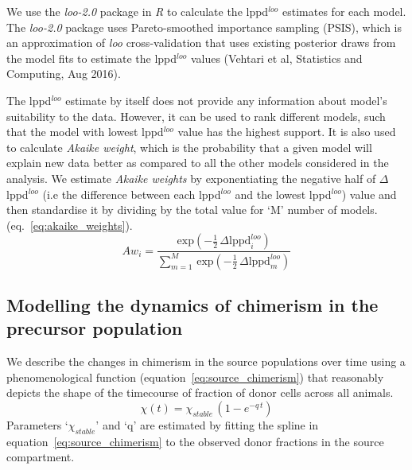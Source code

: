 \documentclass[11pt]{article}
\newcommand{\be}{\begin{equation}}
\newcommand{\ee}{\end{equation}}
\begin{document}
We use the \textit{loo-2.0} package in \textit{R} to calculate the lppd$^{loo}$ estimates for each model. 
The \textit{loo-2.0} package uses Pareto-smoothed importance sampling (PSIS), which is an approximation of \textit{loo} cross-validation that uses existing posterior draws from the model fits to estimate the lppd$^{loo}$ values (Vehtari et al, Statistics and Computing, Aug 2016).

The lppd$^{loo}$ estimate by itself does not provide any information about model's suitability to the data.
However, it can be used to rank different models, such that the model with lowest lppd$^{loo}$ value has the highest support.
It is also used to calculate \textit{Akaike weight}, which is the probability that a given model will explain new data better as compared to all the other models considered in the analysis.  
We estimate \textit{Akaike weights} by exponentiating the negative half of $\Delta$lppd$^{loo}$ (i.e the difference between each lppd$^{loo}$ and the lowest lppd$^{loo}$) value and then standardise it by dividing by the total value for `M' number of models. (eq.~\ref{eq:akaike_weights}).
\be
Aw_i = \frac{\text{exp}(-\frac{1}{2}\, \Delta \text{lppd}^{loo}_i)}{\sum_{m=1}^{M} \,\text{exp}(-\frac{1}{2}\, \Delta \text{lppd}^{loo}_m) }
\label{eq:akaike_weights}
\ee


\clearpage
\subsection{Modelling the dynamics of chimerism in the precursor population}
We describe the changes in chimerism in the source populations over time using a phenomenological function (equation~\ref{eq:source_chimerism}) that reasonably depicts the shape of the timecourse of fraction of donor cells across all animals.
\be
\chi(t) = \chi_{stable} \, (1 - e^{-q \,t}) 
\label{eq:source_chimerism}
\ee
Parameters `$\chi_{stable}$' and `q' are estimated by fitting the spline in equation~\ref{eq:source_chimerism} to the observed donor fractions in the source compartment.
\end{document}
